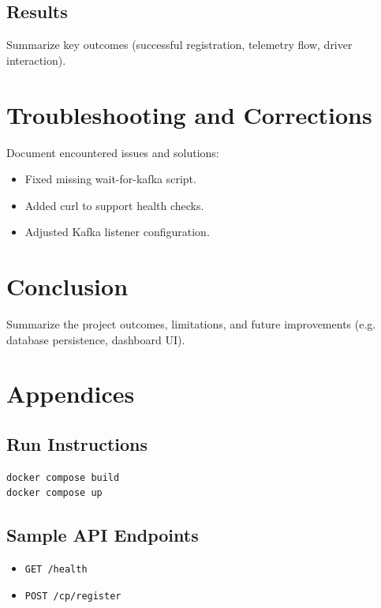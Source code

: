 \documentclass[12pt,a4paper]{article}
\begin{document}
\subsection{Results}
Summarize key outcomes (successful registration, telemetry flow, driver interaction).

\section{Troubleshooting and Corrections}

Document encountered issues and solutions:
\begin{itemize}
    \item Fixed missing wait-for-kafka script.
    \item Added curl to support health checks.
    \item Adjusted Kafka listener configuration.
\end{itemize}

\section{Conclusion}

Summarize the project outcomes, limitations, and future improvements (e.g. database persistence, dashboard UI).

\appendix
\section{Appendices}

\subsection{Run Instructions}
\begin{lstlisting}
docker compose build
docker compose up
\end{lstlisting}

\subsection{Sample API Endpoints}
\begin{itemize}
    \item \texttt{GET /health}
    \item \texttt{POST /cp/register}
\end{itemize}
\end{document}
